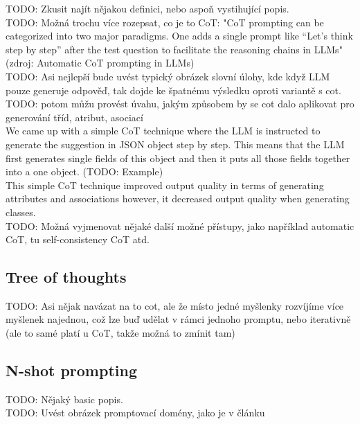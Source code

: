 TODO: Zkusit najít nějakou definici, nebo aspoň vystihující popis. \\

TODO: Možná trochu více rozepsat, co je to CoT: "CoT prompting can be categorized into two major paradigms. One adds a single prompt like “Let’s think step by step”
 after the test question to facilitate the reasoning chains in LLMs" (zdroj: Automatic CoT prompting in LLMs) \\

TODO: Asi nejlepší bude uvést typický obrázek slovní úlohy, kde když LLM pouze generuje odpověď, tak dojde ke špatnému výsledku oproti variantě s cot. \\

TODO: potom můžu provést úvahu, jakým způsobem by se cot dalo aplikovat pro generování tříd, atribut, asociací \\

We came up with a simple CoT technique where the LLM is instructed to generate the  suggestion in JSON object step by step. This means that the LLM first generates single fields of this object and then it puts all those fields together into a one object. (TODO: Example) \\

This simple CoT technique improved output quality in terms of generating attributes and associations however, it decreased output quality when generating classes. \\

TODO: Možná vyjmenovat nějaké další možné přístupy, jako například automatic CoT, tu self-consistency CoT atd. \\


\subsection{Tree of thoughts}

TODO: Asi nějak navázat na to cot, ale že místo jedné myšlenky rozvíjíme více myšlenek najednou, což lze buď udělat v rámci jednoho promptu, nebo iterativně (ale to samé platí u CoT, takže možná to zmínit tam)


\subsection{N-shot prompting}

TODO: Nějaký basic popis. \\

TODO: Uvést obrázek promptovací domény, jako je v článku \\

